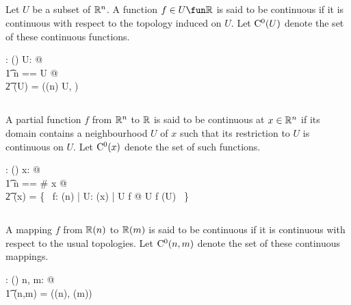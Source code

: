 \documentclass[11pt, oneside]{article}
\begin{document}
\subsection{}

Let $U$ be a subset of $\mathbb{R}^n$.
A function $f \in U \fun \R$ is said to be continuous if it is continuous with respect to the topology induced on $U$.
Let $\operatorname{C^0}(U)$ denote the set of these continuous functions.

\begin{axdef}
	\CzeroPRn: \DeltaR \fun \power(\Rinf \pfun \R)
\where
	\forall U: \DeltaR @ \\
	\t1	\LET n == \dimR U @ \\
	\t2		\CzeroPRn(U) = \CzeroTT(\RtauN(n) \inducedTopSp U, \Rtau)
\end{axdef}

\subsection{}

A partial function $f$ from $\mathbb{R}^n$ to $\mathbb{R}$ is said to be continuous at $x \in \mathbb{R}^n$ if its domain contains a neighbourhood $U$ of $x$
such that its restriction to $U$ is continuous on $U$.
Let $\operatorname{C^0}(x)$ denote the set of such functions.

\begin{axdef}
	\CzeroRn: \Rinf \fun \power(\Rinf \pfun \R)
\where
	\forall x: \Rinf @ \\
	\t1	\LET n == \# x @ \\
	\t2		\CzeroRn(x) = \{~ f: \Rtuples(n) \pfun \R | \exists U: \neighRn(x) | U \subseteq \dom f @ U \dres f \in \CzeroPRn(U) ~\}
\end{axdef}

\subsection{}

A mapping $f$ from $\mathbb{R}(n)$ to $\mathbb{R}(m)$ is said to be continuous if it is continuous with respect to the usual topologies.
Let $\operatorname{C^0}(n,m)$ denote the set of these continuous mappings.

\begin{axdef}
	\CzeroNN: \nat \cross \nat \fun \power(\Rinf \pfun \Rinf)
\where
	\forall n, m: \nat @ \\
	\t1	\CzeroNN(n,m) = \CzeroTT(\RtauN(n), \RtauN(m))
\end{axdef}
\end{document}
